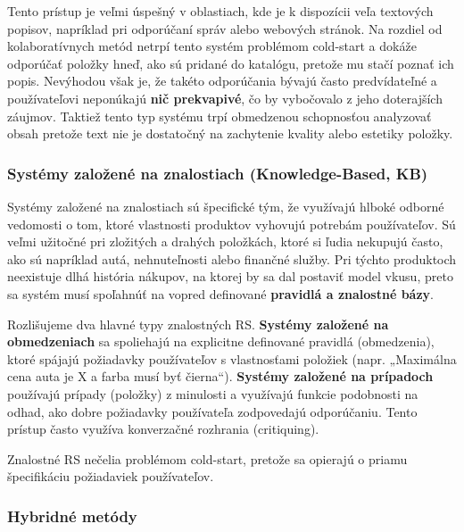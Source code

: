 Tento prístup je veľmi úspešný v oblastiach, kde je k dispozícii veľa textových popisov, napríklad pri odporúčaní správ alebo webových stránok.\cite{Jannach, Aggarwal} Na rozdiel od kolaboratívnych metód netrpí tento systém problémom cold-start a dokáže odporúčať položky hneď, ako sú pridané do katalógu, pretože mu stačí poznať ich popis. Nevýhodou však je, že takéto odporúčania bývajú často predvídateľné a používateľovi neponúkajú \textbf{nič prekvapivé}, čo by vybočovalo z jeho doterajších záujmov. Taktiež tento typ systému trpí obmedzenou schopnosťou analyzovať obsah pretože text nie je dostatočný na zachytenie kvality alebo estetiky položky.\cite{Jannach, Aggarwal, 63}


\subsubsection{Systémy založené na znalostiach (Knowledge-Based, KB)}

Systémy založené na znalostiach sú špecifické tým, že využívajú hlboké odborné vedomosti o tom, ktoré vlastnosti produktov vyhovujú potrebám používateľov. Sú veľmi užitočné pri zložitých a drahých položkách, ktoré si ľudia nekupujú často, ako sú napríklad autá, nehnuteľnosti alebo finančné služby.\cite{Jannach, Ricci} Pri týchto produktoch neexistuje dlhá história nákupov, na ktorej by sa dal postaviť model vkusu, preto sa systém musí spoľahnúť na vopred definované \textbf{pravidlá a znalostné bázy}.\cite{Aggarwal} 

Rozlišujeme dva hlavné typy znalostných RS. \textbf{Systémy založené na obmedzeniach} sa spoliehajú na explicitne definované pravidlá (obmedzenia), ktoré spájajú požiadavky používateľov s vlastnosťami položiek (napr. „Maximálna cena auta je X a farba musí byť čierna“).\cite{Ricci, Aggarwal} \textbf{Systémy založené na prípadoch} používajú prípady (položky) z minulosti a využívajú funkcie podobnosti na odhad, ako dobre požiadavky používateľa zodpovedajú odporúčaniu. Tento prístup často využíva konverzačné rozhrania (critiquing).\cite{Ricci, Jannach, Aggarwal}

Znalostné RS nečelia problémom cold-start, pretože sa opierajú o priamu špecifikáciu požiadaviek používateľov.\cite{Ricci}

\subsubsection{Hybridné metódy}

